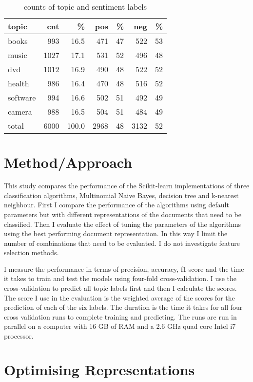 \documentclass[11pt]{article}
\begin{document}
\begin{table}[ht]\footnotesize
\caption{counts of topic and sentiment labels}
\label{tab:corpus}
\begin{tabular}{ l r r r r r r }
topic & cnt & \% & pos & \% & neg & \% \\
\hline
books & 993 & 16.5 & 471 & 47 & 522 & 53 \\
music & 1027 & 17.1 & 531 & 52 & 496 & 48 \\
dvd & 1012 & 16.9 & 490 & 48 & 522 & 52 \\
health & 986 & 16.4 & 470 & 48 & 516 & 52 \\
software & 994 & 16.6 & 502 & 51 & 492 & 49 \\
camera & 988 & 16.5 & 504 & 51 & 484 & 49 \\
\hline
total & 6000 & 100.0 & 2968 & 48 & 3132 & 52 \\
\end{tabular}

\end{table}

\section{Method/Approach}

This study compares the performance of the Scikit-learn implementations of three classification algorithms, Multinomial Naive Bayes, decision tree and k-nearest neighbour. First I compare the performance of the algorithms using default parameters but with different representations of the documents that need to be classified. Then I evaluate the effect of tuning the parameters of the algorithms using the best performing document representation. In this way I limit the number of combinations that need to be evaluated. I do not investigate feature selection methods.

I measure the performance in terms of precision, accuracy, f1-score and the time it takes to train and test the models using four-fold cross-validation. I use the cross-validation to predict all topic labels first and then I calculate the scores. The score I use in the evaluation is the weighted average of the scores for the prediction of each of the six labels. The duration is the time it takes for all four cross validation runs to complete training and predicting. The runs are run in parallel on a computer with 16 GB of RAM and a 2.6 GHz quad core Intel i7 processor.

\section{Optimising Representations}
\end{document}

